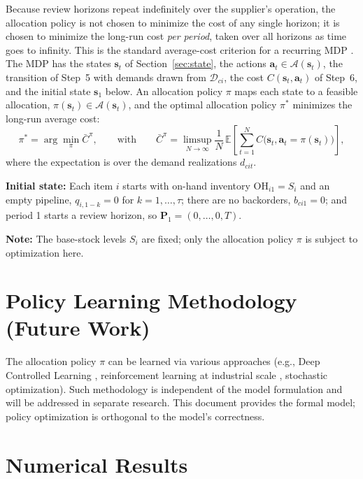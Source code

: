 \documentclass[11pt, a4paper]{article}
\theoremstyle{definition}
\theoremstyle{remark}
\newcommand{\OH}{\text{OH}}
\begin{document}
Because review horizons repeat indefinitely over the supplier's operation, the allocation policy is not chosen to minimize the cost of any single horizon; it is chosen to minimize the long-run cost \emph{per period}, taken over all horizons as time goes to infinity. This is the standard average-cost criterion for a recurring MDP \citep{temizoz2025dcl}. The MDP has the states $\mathbf{s}_t$ of Section~\ref{sec:state}, the actions $\mathbf{a}_t \in \mathcal{A}(\mathbf{s}_t)$, the transition of Step~5 with demands drawn from $\mathcal{D}_{ci}$, the cost $C(\mathbf{s}_t, \mathbf{a}_t)$ of Step~6, and the initial state $\mathbf{s}_1$ below. An allocation policy $\pi$ maps each state to a feasible allocation, $\pi(\mathbf{s}_t) \in \mathcal{A}(\mathbf{s}_t)$, and the optimal allocation policy $\pi^*$ minimizes the long-run average cost:
\begin{equation}
    \pi^* = \arg\min_{\pi} \bar{C}^{\pi}, \qquad \text{with} \qquad \bar{C}^{\pi} = \limsup_{N \to \infty} \frac{1}{N} \, \mathbb{E}\left[\sum_{t=1}^{N} C\big(\mathbf{s}_t, \mathbf{a}_t = \pi(\mathbf{s}_t)\big)\right],
\end{equation}
where the expectation is over the demand realizations $d_{cit}$.

\textbf{Initial state:} Each item $i$ starts with on-hand inventory $\OH_{i1} = S_i$ and an empty pipeline, $q_{i,1-k} = 0$ for $k = 1, \ldots, \tau$; there are no backorders, $b_{ci1} = 0$; and period 1 starts a review horizon, so $\mathbf{P}_1 = (0, \ldots, 0, T)$.

\textbf{Note:} The base-stock levels $S_i$ are fixed; only the allocation policy $\pi$ is subject to optimization here.

\section{Policy Learning Methodology (Future Work)}

The allocation policy $\pi$ can be learned via various approaches (e.g., Deep Controlled Learning \citep{temizoz2025dcl}, reinforcement learning at industrial scale \citep{vanderhaar2026asml}, stochastic optimization). Such methodology is independent of the model formulation and will be addressed in separate research. This document provides the formal model; policy optimization is orthogonal to the model's correctness.

\section{Numerical Results}
\label{sec:results}
\end{document}
